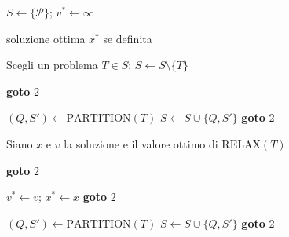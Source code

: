 \documentclass[a4paper,12pt]{article}
\begin{document}
\begin{algorithm}[H]
\caption{Branch and Bound per $\mathcal{P}$}
\begin{algorithmic}[1]

\State $S \leftarrow \{\mathcal{P}\}$; \quad $v^* \leftarrow \infty$

    \State \Return soluzione ottima $x^*$ se definita
\EndIf

\State Scegli un problema $T \in S$; \quad $S \leftarrow S \setminus \{T\}$

    \State \textbf{goto} 2
\EndIf

    \State $(Q, S') \leftarrow \mathrm{PARTITION}(T)$
    \State $S \leftarrow S \cup \{Q, S'\}$
    \State \textbf{goto} 2
\EndIf

\State Siano $x$ e $v$ la soluzione e il valore ottimo di $\mathrm{RELAX}(T)$

    \State \textbf{goto} 2
\EndIf

    \State $v^* \leftarrow v$; \quad $x^* \leftarrow x$
    \State \textbf{goto} 2
\EndIf

    \State $(Q, S') \leftarrow \mathrm{PARTITION}(T)$
    \State $S \leftarrow S \cup \{Q, S'\}$
    \State \textbf{goto} 2
\EndIf

\end{algorithmic}
\end{algorithm}
\end{document}
